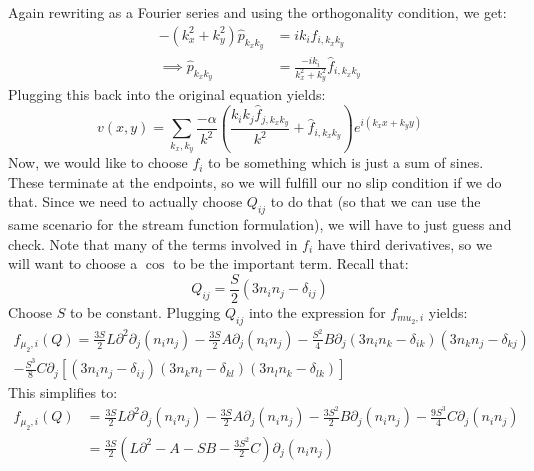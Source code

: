 \documentclass[reqno]{article}
\begin{document}
	Again rewriting as a Fourier series and using the orthogonality condition, we get:
	\begin{equation}
	\begin{split}
		-\left( k_x^2 + k_y^2 \right) \hat{p}_{k_x k_y}
		&= i k_i \hat{f}_{i, k_x k_y} \\
		\implies \hat{p}_{k_x k_y}
		&= \frac{ -i k_i }{ k_x^2 + k_y^2 } \hat{f}_{i, k_x k_y}
	\end{split}
	\end{equation}
	Plugging this back into the original equation yields:
	\begin{equation}
		v(x, y) 
		= \sum_{k_x, k_y} \frac{ -\alpha }{ k^2 } \left(
		\frac{ k_i k_j \hat{f}_{j, k_x k_y} }{k^2}
		+ \hat{f}_{i, k_x k_y}
		\right)
		e^{ i \left( k_x x + k_y y \right) }
	\end{equation}
	Now, we would like to choose $f_i$ to be something which is just a sum of sines.
	These terminate at the endpoints, so we will fulfill our no slip condition if we do that.
	Since we need to actually choose $Q_{ij}$ to do that (so that we can use the same scenario for the stream function formulation), we will have to just guess and check.
	Note that many of the terms involved in $f_i$ have third derivatives, so we will want to choose a $\cos$ to be the important term. 
	Recall that:
	\begin{equation}
		Q_{ij} 
		= \frac{S}{2} \left( 3 n_i n_j - \delta_{ij} \right)
	\end{equation}
	Choose $S$ to be constant. 
	Plugging $Q_{ij}$ into the expression for $f_{mu_2, i}$ yields:
	\begin{multline}
		f_{\mu_2, i} (Q)
		= \frac{3 S}{2} L \partial^2 \partial_j \left( n_i n_j \right)
		- \frac{3 S}{2} A \partial_j \left( n_i n_j \right)
		- \frac{S^2}{4} B \partial_j 
		\left( 3 n_i n_k - \delta_{ik} \right)
		\left( 3 n_k n_j - \delta_{kj} \right)\\
		- \frac{S^3}{8} C \partial_j
		\left[
		\left( 3 n_i n_j - \delta_{ij} \right)
		\left( 3 n_k n_l - \delta_{kl} \right)
		\left( 3 n_l n_k - \delta_{lk} \right)
		\right]
	\end{multline}
	This simplifies to:
	\begin{equation}
	\begin{split}
		f_{\mu_2, i} (Q)
		&= \frac{3 S}{2} L \partial^2 \partial_j \left( n_i n_j \right)
		- \frac{3 S}{2} A \partial_j \left( n_i n_j \right)
		- \frac{3 S^2}{2} B \partial_j \left( n_i n_j \right)
		- \frac{9 S^3}{4} C \partial_j
		\left( n_i n_j \right) \\
		&= \frac{3 S}{2} 
		\left(
		L \partial^2 - A - S B - \frac{3 S^2}{2} C
		\right)
		\partial_j \left( n_i n_j \right)
	\end{split}
	\end{equation}
\end{document}
